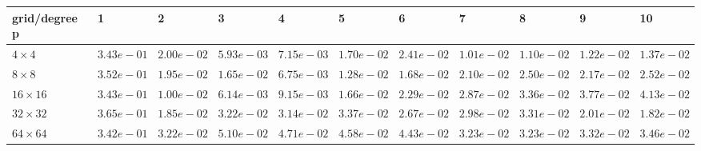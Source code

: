\begin{tabular}{lllllllllll}
\hline
 grid/degree p   & 1          & 2          & 3          & 4          & 5          & 6          & 7          & 8          & 9          & 10         \\
\hline
 $4 \times 4$    & $3.43e-01$ & $2.00e-02$ & $5.93e-03$ & $7.15e-03$ & $1.70e-02$ & $2.41e-02$ & $1.01e-02$ & $1.10e-02$ & $1.22e-02$ & $1.37e-02$ \\
 $8 \times 8$    & $3.52e-01$ & $1.95e-02$ & $1.65e-02$ & $6.75e-03$ & $1.28e-02$ & $1.68e-02$ & $2.10e-02$ & $2.50e-02$ & $2.17e-02$ & $2.52e-02$ \\
 $16 \times 16$  & $3.43e-01$ & $1.00e-02$ & $6.14e-03$ & $9.15e-03$ & $1.66e-02$ & $2.29e-02$ & $2.87e-02$ & $3.36e-02$ & $3.77e-02$ & $4.13e-02$ \\
 $32 \times 32$  & $3.65e-01$ & $1.85e-02$ & $3.22e-02$ & $3.14e-02$ & $3.37e-02$ & $2.67e-02$ & $2.98e-02$ & $3.31e-02$ & $2.01e-02$ & $1.82e-02$ \\
 $64 \times 64$  & $3.42e-01$ & $3.22e-02$ & $5.10e-02$ & $4.71e-02$ & $4.58e-02$ & $4.43e-02$ & $3.23e-02$ & $3.23e-02$ & $3.32e-02$ & $3.46e-02$ \\
\hline
\end{tabular}